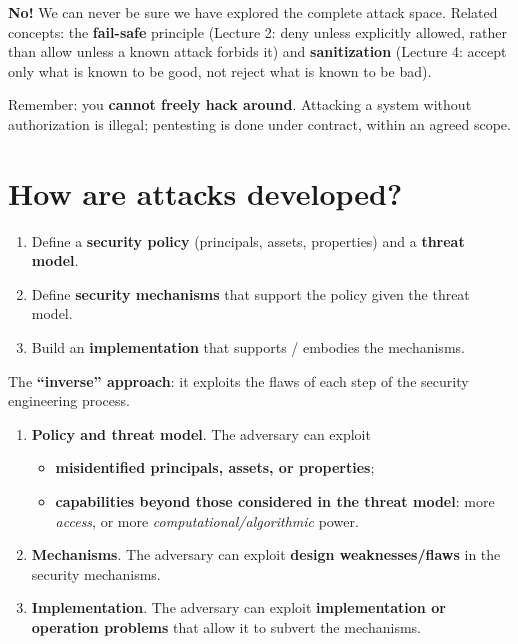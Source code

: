 \begin{warnbox}[title=Does a lack of found attacks guarantee that the system is secure?]
\textbf{No!} We can never be sure we have explored the complete attack space. Related concepts:
the \textbf{fail-safe} principle (Lecture 2: deny unless explicitly allowed, rather than allow
unless a known attack forbids it) and \textbf{sanitization} (Lecture 4: accept only what is known
to be good, not reject what is known to be bad).
\end{warnbox}

\begin{warnbox}[title={Ethics, law and regulations}]
Remember: you \textbf{cannot freely hack around}. Attacking a system without authorization is
illegal; pentesting is done under contract, within an agreed scope.
\end{warnbox}

\section{How are attacks developed?}

\begin{rembox}[title={Recall: the security engineering process (Lectures 1 and 2)}]
\begin{enumerate}
  \item Define a \textbf{security policy} (principals, assets, properties) and a \textbf{threat
        model}.
  \item Define \textbf{security mechanisms} that support the policy given the threat model.
  \item Build an \textbf{implementation} that supports / embodies the mechanisms.
\end{enumerate}
\end{rembox}

\begin{defnbox}[title=The attack engineering process]
The \textbf{``inverse'' approach}: it exploits the flaws of each step of the security engineering
process.
\begin{enumerate}
  \item \textbf{Policy and threat model}. The adversary can exploit
        \begin{itemize}
          \item \textbf{misidentified principals, assets, or properties};
          \item \textbf{capabilities beyond those considered in the threat model}: more
                \emph{access}, or more \emph{computational/algorithmic} power.
        \end{itemize}
  \item \textbf{Mechanisms}. The adversary can exploit \textbf{design weaknesses/flaws} in the
        security mechanisms.
  \item \textbf{Implementation}. The adversary can exploit \textbf{implementation or operation
        problems} that allow it to subvert the mechanisms.
\end{enumerate}
\end{defnbox}


